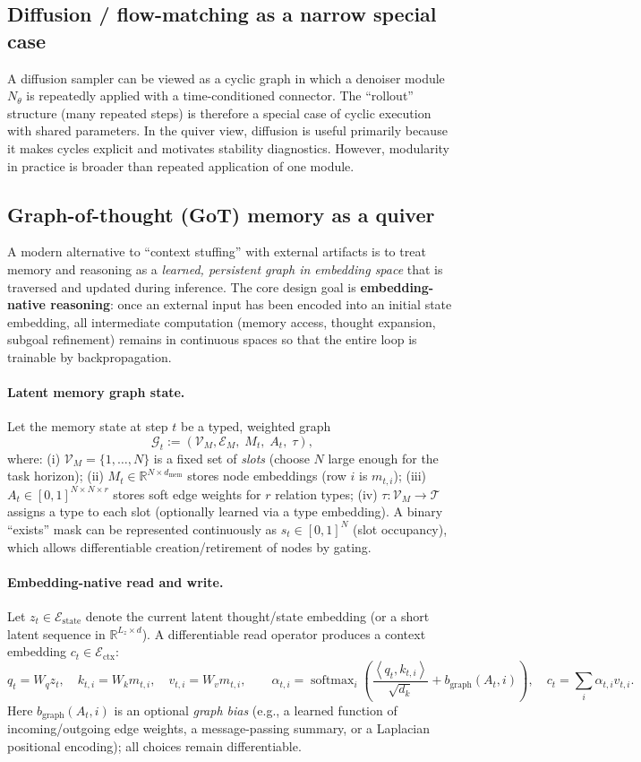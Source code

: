 \documentclass[11pt]{article}
\theoremstyle{definition}
\theoremstyle{plain}
\theoremstyle{remark}
\newcommand{\R}{\mathbb{R}}
\newcommand{\ip}[2]{\left\langle #1, #2 \right\rangle}
\newcommand{\softmax}{\operatorname{softmax}}
\newcommand{\mc}[1]{\mathcal{#1}}
\newcommand{\Emb}{\mc{E}}
\begin{document}
\subsection{Diffusion / flow-matching as a narrow special case}
A diffusion sampler can be viewed as a cyclic graph in which a denoiser module $N_\theta$ is repeatedly applied with a time-conditioned connector.
The ``rollout'' structure (many repeated steps) is therefore a special case of cyclic execution with shared parameters.
In the quiver view, diffusion is useful primarily because it makes cycles explicit and motivates stability diagnostics.
However, modularity in practice is broader than repeated application of one module.

\subsection{Graph-of-thought (GoT) memory as a quiver}

A modern alternative to ``context stuffing'' with external artifacts is to treat memory and reasoning as a \emph{learned, persistent graph in embedding space} that is traversed and updated during inference.
The core design goal is \textbf{embedding-native reasoning}: once an external input has been encoded into an initial state embedding, all intermediate computation (memory access, thought expansion, subgoal refinement) remains in continuous spaces so that the entire loop is trainable by backpropagation.

\paragraph{Latent memory graph state.}
Let the memory state at step $t$ be a typed, weighted graph
\[
\mc{G}_t := (\mc{V}_M,\mc{E}_M,\; M_t,\; A_t,\; \tau),
\]
where:
(i) $\mc{V}_M=\{1,\dots,N\}$ is a fixed set of \emph{slots} (choose $N$ large enough for the task horizon);
(ii) $M_t\in\R^{N\times d_{\mathrm{mem}}}$ stores node embeddings (row $i$ is $m_{t,i}$);
(iii) $A_t\in[0,1]^{N\times N\times r}$ stores soft edge weights for $r$ relation types;
(iv) $\tau:\mc{V}_M\to\mc{T}$ assigns a type to each slot (optionally learned via a type embedding).
A binary ``exists'' mask can be represented continuously as $s_t\in[0,1]^N$ (slot occupancy), which allows differentiable creation/retirement of nodes by gating.

\paragraph{Embedding-native read and write.}
Let $z_t\in\Emb_{\text{state}}$ denote the current latent thought/state embedding (or a short latent sequence in $\R^{L_z\times d}$).
A differentiable read operator produces a context embedding $c_t\in\Emb_{\text{ctx}}$:
\[
q_t=W_q z_t,\quad
k_{t,i}=W_k m_{t,i},\quad
v_{t,i}=W_v m_{t,i},
\qquad
\alpha_{t,i}=\softmax_i\!\left(\frac{\ip{q_t}{k_{t,i}}}{\sqrt{d_k}} + b_{\mathrm{graph}}(A_t,i)\right),
\quad
c_t=\sum_i \alpha_{t,i} v_{t,i}.
\]
Here $b_{\mathrm{graph}}(A_t,i)$ is an optional \emph{graph bias} (e.g., a learned function of incoming/outgoing edge weights, a message-passing summary, or a Laplacian positional encoding); all choices remain differentiable.
\end{document}
